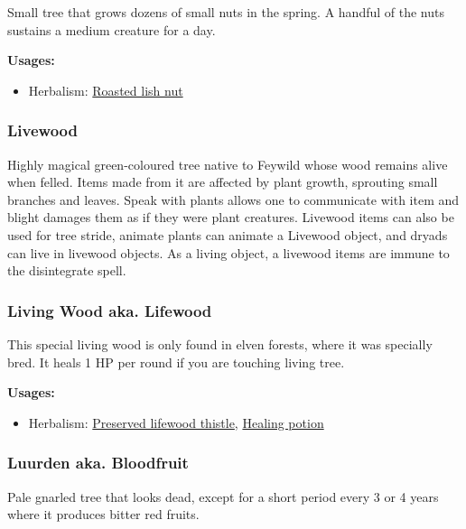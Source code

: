 Small tree that grows dozens of small nuts in the spring. A handful of the nuts sustains a medium creature for a day.

\vspace{5mm}

\textbf{Usages:}

\begin{itemize}[noitemsep]
\item[] Herbalism: \hyperref[Roasted lish nut]{Roasted lish nut}
\end{itemize}

\subsubsection{Livewood}
\label{Livewood}

Highly magical green-coloured tree native to Feywild whose wood remains alive when felled. Items made from it are affected by plant growth, sprouting small branches and leaves. Speak with plants allows one to communicate with item and blight damages them as if they were plant creatures. Livewood items can also be used for tree stride, animate plants can animate a Livewood object, and dryads can live in livewood objects. As a living object, a livewood items are immune to the disintegrate spell.

\subsubsection{Living Wood aka. Lifewood}
\label{Lifewood}

This special living wood is only found in elven forests, where it was specially bred. It heals 1 HP per round if you are touching living tree.

\vspace{5mm}

\textbf{Usages:}

\begin{itemize}[noitemsep]
\item[] Herbalism: \hyperref[Preserved lifewood thistle]{Preserved lifewood thistle}, \hyperref[healing_potion]{Healing potion}
\end{itemize}

\subsubsection{Luurden aka. Bloodfruit}
\label{Luurden}

Pale gnarled tree that looks dead, except for a short period every 3 or 4 years where it produces bitter red fruits.

